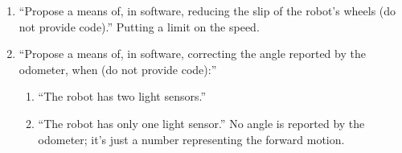 \documentclass[twocolumn]{article}
\begin{document}
\begin{enumerate}
\item ``Propose a means of, in software, reducing the slip of the robot's wheels (do not provide code).\cite{lab2}'' Putting a limit on the speed.
\item ``Propose a means of, in software, correcting the angle reported by the odometer, when (do not provide code):\cite{lab2}''
\begin{enumerate}
\item ``The robot has two light sensors.\cite{lab2}''
\item ``The robot has only one light sensor.\cite{lab2}''
No angle is reported by the odometer; it's just a number representing the forward motion\cite{simpson1989oxford}.
\end{enumerate}
\end{enumerate}


\end{document}

